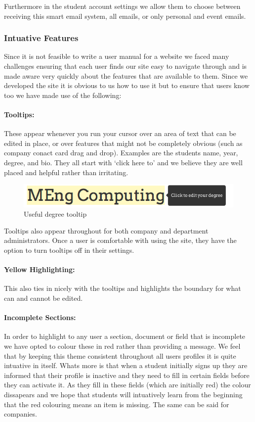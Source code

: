     Furthermore in the student account settings we allow them to choose between receiving this smart email system, all emails, or only personal and event emails.

  \subsubsection{Intuative Features}
    Since it is not feasible to write a user manual for a website we faced many challenges ensuring that each user finds our site easy to navigate through and is made aware very quickly about the features that are available to them. Since we developed the site it is obvious to us how to use it but to ensure that users know too we have made use of the following:

    \paragraph{Tooltips:} These appear whenever you run your cursor over an area of text that can be edited in place, or over features that might not be completely obvious (such as company conact card drag and drop). Examples are the students name, year, degree, and bio. They all start with `click here to' and we believe they are well placed and helpful rather than irritating.      
    \begin{figure}[H]\centering
    \includegraphics[scale=0.5]{images/design/edit_degree_tooltip}
    \caption{Useful degree tooltip}
    \end{figure}
    Tooltips also appear throughout for both company and department administrators.
    Once a user is comfortable with using the site, they have the option to turn tooltips off in their settings.

    \paragraph{Yellow Highlighting:} This also ties in nicely with the tooltips and highlights the boundary for what can and cannot be edited.

    \paragraph{Incomplete Sections:} In order to highlight to any user a section, document or field that is incomplete we have opted to colour these in red rather than providing a message. We feel that by keeping this theme consistent throughout all users profiles it is quite intuative in itself.
    Whats more is that when a student initially signs up they are informed that their profile is inactive and they need to fill in certain fields before they can activate it. As they fill in these fields (which are initially red) the colour dissapears and we hope that students will intuatively learn from the beginning that the red colouring means an item is missing. The same can be said for companies.

